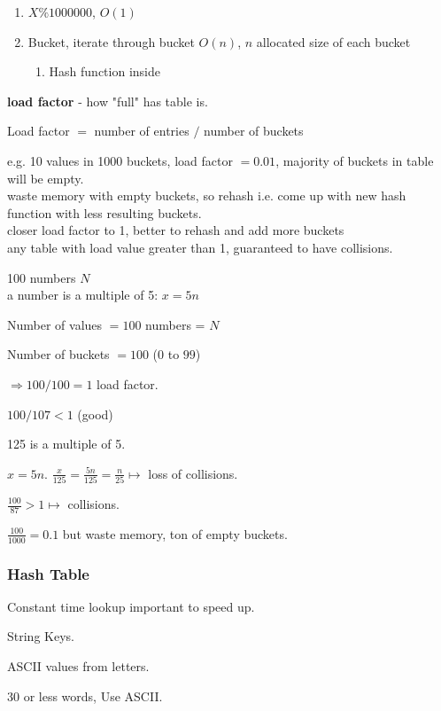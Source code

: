 \documentclass[10pt]{amsart}
\begin{document}
\begin{enumerate}
	\item $ X \% 1000000$, $O(1)$ 
	\item Bucket, iterate through bucket $O(n)$, $n$ allocated size of each bucket
\begin{enumerate}
	\item  Hash function inside 
\end{enumerate}
\end{enumerate}

\textbf{load factor} - how "full" has table is.

Load factor $=$ number of entries $/$ number of buckets 

e.g. 10 values in 1000 buckets, load factor $=0.01$, majority of buckets in table will be empty. \\
waste memory with empty buckets, so rehash i.e. come up with new hash function with less resulting buckets. \\

closer load factor to 1, better to rehash and add more buckets \\
any table with load value greater than 1, guaranteed to have collisions.

100 numbers $N$ \\
a number is a multiple of 5: $x = 5n$ 

Number of values $= 100$ numbers = $N$

Number of buckets $= 100$ ($0$ to $99$)

$\Longrightarrow 100/ 100 = 1$ load factor.

$100/107 < 1$ (good)

125 is a multiple of 5.

$x=5n$. $\frac{x}{125} = \frac{5n}{125} = \frac{n}{25} \mapsto $ loss of collisions.

$\frac{100}{87} > 1 \mapsto$ collisions.

$\frac{100}{1000} = 0.1$ but waste memory, ton of empty buckets.

\subsubsection{Hash Table}

Constant time lookup important to speed up.

String Keys.

ASCII values from letters.

30 or less words, Use ASCII. 
\end{document}

